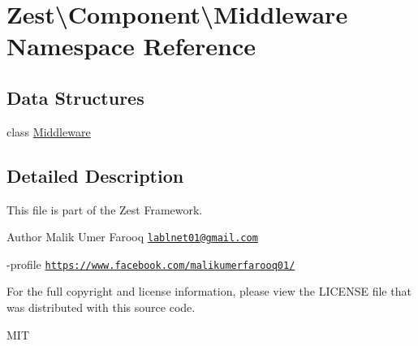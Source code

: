 \hypertarget{namespace_zest_1_1_component_1_1_middleware}{}\section{Zest\textbackslash{}Component\textbackslash{}Middleware Namespace Reference}
\label{namespace_zest_1_1_component_1_1_middleware}
\subsection*{Data Structures}
\begin{DoxyCompactItemize}
\item 
class \mbox{\hyperlink{class_zest_1_1_component_1_1_middleware_1_1_middleware}{Middleware}}
\end{DoxyCompactItemize}


\subsection{Detailed Description}
This file is part of the Zest Framework.

\begin{DoxyAuthor}{Author}
Malik Umer Farooq \href{mailto:lablnet01@gmail.com}{\tt lablnet01@gmail.\+com} 

-\/profile \href{https://www.facebook.com/malikumerfarooq01/}{\tt https\+://www.\+facebook.\+com/malikumerfarooq01/}
\end{DoxyAuthor}
For the full copyright and license information, please view the L\+I\+C\+E\+N\+SE file that was distributed with this source code.

M\+IT 